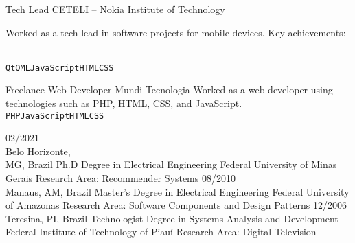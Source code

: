 \documentclass[9pt]{developercv} %
\begin{document}
\begin{entrylist}
  {Tech Lead}
  {CETELI -- Nokia Institute of Technology}
  {
    Worked as a tech lead in software projects for mobile devices. Key achievements:\\
    \begin{contributionlist}
    \end{contributionlist}\\
    \texttt{Qt}\slashsep\texttt{QML}\slashsep\texttt{JavaScript}\slashsep\texttt{HTML}\slashsep\texttt{CSS}}
  {Freelance Web Developer}
  {Mundi Tecnologia}
  {Worked as a web developer using technologies such as PHP,
    HTML, CSS, and JavaScript.\\
    \texttt{PHP}\slashsep\texttt{JavaScript}\slashsep\texttt{HTML}\slashsep\texttt{CSS}}
\end{entrylist}



\begin{entrylist}
  \entry
  {02/2021\\\footnotesize{Belo Horizonte, \\MG, Brazil}}
  {Ph.D Degree in Electrical Engineering}
  {Federal University of Minas Gerais}
  {Research Area: Recommender Systems}
  \entry
  {08/2010\\\footnotesize{Manaus, AM, Brazil}}
  {Master's Degree in Electrical Engineering}
  {Federal University of Amazonas}
  {Research Area: Software Components and Design Patterns}
  \entry
  {12/2006\\\footnotesize{Teresina, PI, Brazil}}
  {Technologist Degree in Systems Analysis and Development}
  {Federal Institute of Technology of Piauí}
  {Research Area: Digital Television}
\end{entrylist}


\begin{minipage}[t]{0.3\textwidth}
  \vspace{-\baselineskip} %


  \begin{skills}
  \end{skills}
\end{minipage}
\end{document}
